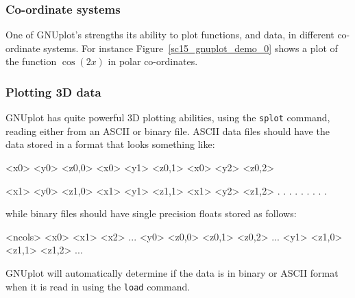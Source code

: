 \documentclass[twoside,11pt]{starlink}
\begin{document}

\subsubsection{Co-ordinate systems}

One of GNUplot's strengths its ability to plot functions, and data, in
different co-ordinate systems. For instance
Figure~\ref{sc15_gnuplot_demo_0} shows a plot of the function
$\cos(2x)$ in polar co-ordinates.


\subsubsection{Plotting 3D data\label{sc15_gnuplot_3d}}

GNUplot has quite powerful 3D plotting abilities, using the \texttt{splot} command, reading either from an ASCII or binary file. ASCII
data files should have the data stored in a format that looks
something like:

\begin{small}
\begin{terminalv}
   <x0> <y0> <z0,0>
   <x0> <y1> <z0,1>
   <x0> <y2> <z0,2>

   <x1> <y0> <z1,0>
   <x1> <y1> <z1,1>
   <x1> <y2> <z1,2>
     .    .     .
     .    .     .
     .    .     .
\end{terminalv}
\end{small}

while binary files should have single precision floats stored as follows:

\begin{small}
\begin{terminalv}
   <ncols> <x0> <x1> <x2> ...
   <y0> <z0,0> <z0,1> <z0,2> ...
   <y1> <z1,0> <z1,1> <z1,2> ...
\end{terminalv}
\end{small}

GNUplot will automatically determine if the data is in binary or ASCII
format when it is read in using the \texttt{load} command.
\end{document}
